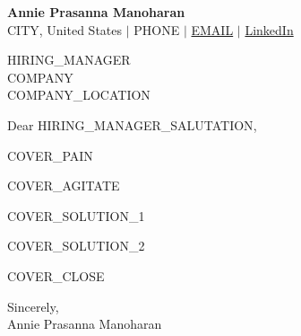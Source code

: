 \documentclass[letterpaper,11pt]{article}
\begin{document}
\noindent
\textbf{\Large Annie Prasanna Manoharan} \\
{{CITY}}, United States $|$ {{PHONE}} $|$ \href{mailto:{{EMAIL}}}{{{EMAIL}}} $|$ \href{{{LINKEDIN_URL}}}{LinkedIn}

\vspace{1em}

\vspace{1em}
\noindent
{{HIRING_MANAGER}} \\
{{COMPANY}} \\
{{COMPANY_LOCATION}}

\vspace{1em}
\noindent Dear {{HIRING_MANAGER_SALUTATION}},

{{COVER_PAIN}}

{{COVER_AGITATE}}

{{COVER_SOLUTION_1}}

{{COVER_SOLUTION_2}}

{{COVER_CLOSE}}

\vspace{1em}
\noindent
Sincerely, \\
Annie Prasanna Manoharan
\end{document}
